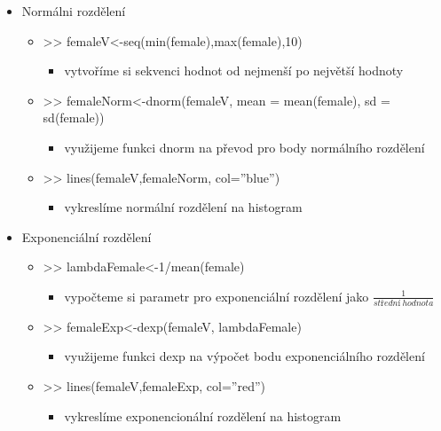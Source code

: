 \documentclass[paper=a4, fontsize=12pt]{scrartcl}
\numberwithin{equation}{section}		%
\numberwithin{figure}{section}			%
\numberwithin{table}{section}				%
\begin{document}
\begin{itemize}
\begin{itemize}
\begin{itemize}
		        \end{itemize}
		\item Normálni rozdělení
			\begin{itemize}
		        \item >> femaleV<-seq(min(female),max(female),10)
		                \begin{itemize}
		                \item vytvoříme si sekvenci hodnot od nejmenší po největší hodnoty 
		                \end{itemize}
		        \item >> femaleNorm<-dnorm(femaleV, mean = mean(female), sd = sd(female))
		                \begin{itemize}
		                \item využijeme funkci dnorm na převod pro body normálního rozdělení
		                \end{itemize}
		        \item >> lines(femaleV,femaleNorm, col=''blue'')
		                \begin{itemize}
		                \item vykreslíme normální rozdělení na histogram
		                \end{itemize}
		        \end{itemize}
		\item Exponenciální rozdělení
			\begin{itemize}
		        \item >> lambdaFemale<-1/mean(female)
		                \begin{itemize}
		                \item vypočteme si parametr pro exponenciální rozdělení jako $\frac{1}{střední \ hodnota}$
		                \end{itemize}
		        \item >> femaleExp<-dexp(femaleV, lambdaFemale)
		                \begin{itemize}
		                \item využijeme funkci dexp na výpočet bodu exponenciálního rozdělení
		                \end{itemize}
		        \item >> lines(femaleV,femaleExp, col=''red'')
		                \begin{itemize}
		                \item vykreslíme exponencionální rozdělení na histogram
		                \end{itemize}

\end{itemize}
\end{itemize}
\end{itemize}
\end{document}
